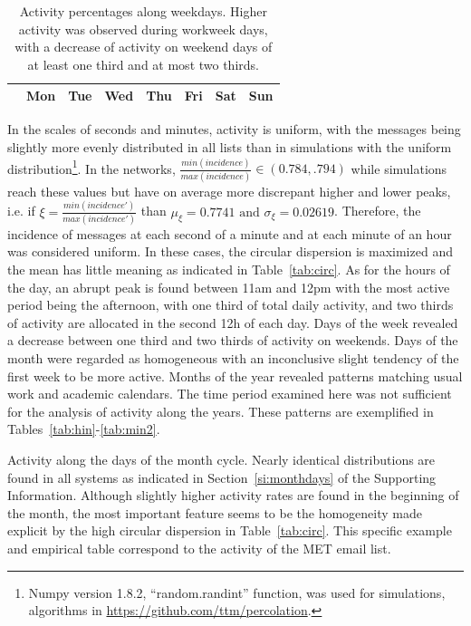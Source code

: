 \documentclass[%
aip,
jmp,%
amsmath,amssymb,
reprint,%
]{revtex4-1}
\begin{document}
\begin{table}
\caption{Activity percentages along weekdays.
Higher activity was observed during workweek days, with a decrease of activity on weekend days of at least one third and at most two thirds.}
\begin{center}
\begin{tabular}{ | l ||  c | c | c | c | c |   c | c |}
\hline
& Mon & Tue & Wed & Thu & Fri & Sat & Sun  \\ \hline

\end{tabular}
\end{center}
\label{tab:win}
\end{table}

In the scales of seconds and minutes, activity is uniform,
with the messages being slightly more evenly distributed in all lists than in simulations with the uniform distribution\footnote{Numpy version 1.8.2, ``random.randint'' function, was used for simulations, algorithms in \url{https://github.com/ttm/percolation}.}.
In the networks, $\frac{min(incidence)}{max(incidence)} \in (0.784,.794)$ while simulations reach these values but have on average more discrepant higher and lower peaks, i.e. if $\xi=\frac{min(incidence')}{max(incidence')}$ than $\mu_\xi=0.7741 \text{ and } \sigma_\xi=0.02619$.
Therefore, the incidence of messages at each second of a minute and at each minute of an hour was considered uniform.
In these cases, the circular dispersion is maximized and the mean has little meaning as indicated in Table~\ref{tab:circ}.
As for the hours of the day, an abrupt peak is found between 11am and 12pm with the most active period being the afternoon, with one third of total daily activity, and two thirds of activity are allocated in the second 12h of each day. Days of the week revealed a decrease between one third and two thirds of activity on weekends.
Days of the month were regarded as homogeneous with an inconclusive slight tendency of the first week to be more active.
Months of the year revealed patterns matching usual work and academic calendars. The time period examined here was not sufficient for the analysis of activity along the years. These patterns are exemplified in Tables~\ref{tab:hin}-\ref{tab:min2}.


\FloatBarrier

\begin{table}
\caption{Activity along the days of the month cycle.
Nearly identical distributions are found in all systems
as indicated in Section~\ref*{si:monthdays} of the Supporting Information. Although slightly higher activity rates are found in the beginning of the month, the most important feature seems to be the homogeneity made explicit by the high circular dispersion in Table~\ref{tab:circ}.
This specific example and empirical table correspond to the activity of the MET email list.}
\footnotesize

\label{tab:min}
\end{table}
\end{document}
